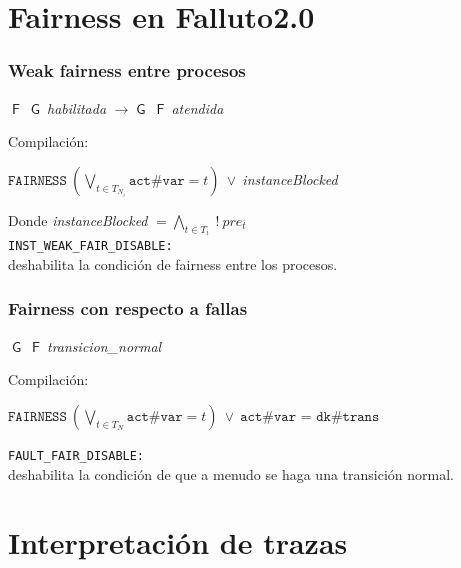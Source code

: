 \documentclass[serif]{beamer}
\newcommand{\G}{\mathop{\mathsf{G}}}
\newcommand{\F}{\mathop{\mathsf{F}}}
\begin{document}
\section[Fairness]{Fairness en Falluto2.0}

\begin{frame}
\frametitle{Weak fairness entre procesos}
\begin{framed}
$\F~\G~$\textit{habilitada} $\rightarrow \G~\F~$\textit{atendida}
\end{framed}
Compilación:
\begin{framed}
$\texttt{FAIRNESS}~(\bigvee_{t \in T_{N_i}} \texttt{act\#var} = t)~\vee~$\textit{instanceBlocked}
\end{framed}
Donde \textit{instanceBlocked} $= \bigwedge_{t \in T_i}~!~pre_t~$\\[0.5cm]
\texttt{INST\_WEAK\_FAIR\_DISABLE:}\\
deshabilita la condición de fairness entre los procesos.
\end{frame}


\begin{frame}
\frametitle{Fairness con respecto a fallas}
\begin{framed}
$\G~\F~$\textit{transicion\_normal}
\end{framed}
Compilación:
\begin{framed}
$\texttt{FAIRNESS}~(\bigvee_{t \in {T_N}} \texttt{act\#var} = t)~\vee~\texttt{act\#var = dk\#trans}$
\end{framed}
\texttt{FAULT\_FAIR\_DISABLE:}\\
deshabilita la condición de que a menudo se haga una transición normal.\\[0.3cm]
\end{frame}

\section[Trazas]{Interpretación de trazas}
\end{document}
